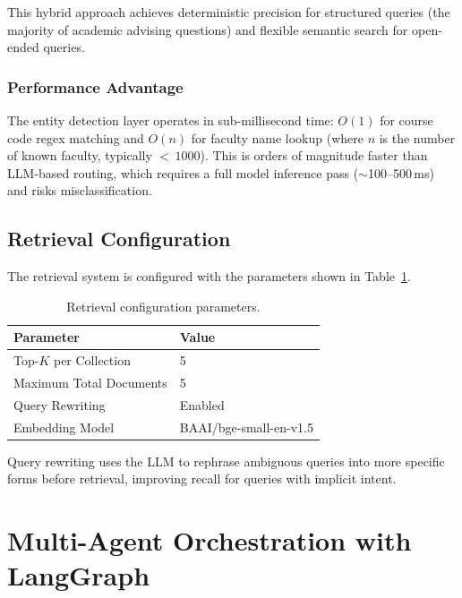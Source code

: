 \documentclass[conference,compsoc]{IEEEtran}
\begin{document}
This hybrid approach achieves deterministic precision for structured queries (the majority of academic advising questions) and flexible semantic search for open-ended queries.

\subsubsection{Performance Advantage}

The entity detection layer operates in sub-millisecond time: $O(1)$ for course code regex matching and $O(n)$ for faculty name lookup (where $n$ is the number of known faculty, typically ${<}\,1000$). This is orders of magnitude faster than LLM-based routing, which requires a full model inference pass (${\sim}$100--500\,ms) and risks misclassification.

\subsection{Retrieval Configuration}

The retrieval system is configured with the parameters shown in Table~\ref{tab:retrieval_config}.

\begin{table}[htbp]
\centering
\caption{Retrieval configuration parameters.}
\label{tab:retrieval_config}
\begin{tabular}{ll}
\toprule
\textbf{Parameter} & \textbf{Value} \\
\midrule
Top-$K$ per Collection & 5 \\
Maximum Total Documents & 5 \\
Query Rewriting & Enabled \\
Embedding Model & BAAI/bge-small-en-v1.5 \\
\bottomrule
\end{tabular}
\end{table}

Query rewriting uses the LLM to rephrase ambiguous queries into more specific forms before retrieval, improving recall for queries with implicit intent.

\section{Multi-Agent Orchestration with LangGraph}
\label{sec:orchestration}
\end{document}
